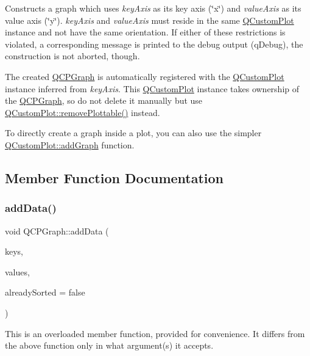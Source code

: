 Constructs a graph which uses {\itshape key\+Axis} as its key axis (\char`\"{}x\char`\"{}) and {\itshape value\+Axis} as its value axis (\char`\"{}y\char`\"{}). {\itshape key\+Axis} and {\itshape value\+Axis} must reside in the same \hyperlink{class_q_custom_plot}{Q\+Custom\+Plot} instance and not have the same orientation. If either of these restrictions is violated, a corresponding message is printed to the debug output (q\+Debug), the construction is not aborted, though.

The created \hyperlink{class_q_c_p_graph}{Q\+C\+P\+Graph} is automatically registered with the \hyperlink{class_q_custom_plot}{Q\+Custom\+Plot} instance inferred from {\itshape key\+Axis}. This \hyperlink{class_q_custom_plot}{Q\+Custom\+Plot} instance takes ownership of the \hyperlink{class_q_c_p_graph}{Q\+C\+P\+Graph}, so do not delete it manually but use \hyperlink{class_q_custom_plot_af3dafd56884208474f311d6226513ab2}{Q\+Custom\+Plot\+::remove\+Plottable()} instead.

To directly create a graph inside a plot, you can also use the simpler \hyperlink{class_q_custom_plot_a6fb2873d35a8a8089842d81a70a54167}{Q\+Custom\+Plot\+::add\+Graph} function. 

\subsection{Member Function Documentation}
\mbox{\label{class_q_c_p_graph_ae0555c0d3fe0fa7cb8628f88158d420f}} 
\subsubsection{\texorpdfstring{add\+Data()}{addData()}\hspace{0.1cm}{\footnotesize\ttfamily [1/2]}}
{\footnotesize\ttfamily void Q\+C\+P\+Graph\+::add\+Data (\begin{DoxyParamCaption}\item[{const Q\+Vector$<$ double $>$ \&}]{keys,  }\item[{const Q\+Vector$<$ double $>$ \&}]{values,  }\item[{bool}]{already\+Sorted = {\ttfamily false} }\end{DoxyParamCaption})}

This is an overloaded member function, provided for convenience. It differs from the above function only in what argument(s) it accepts.

